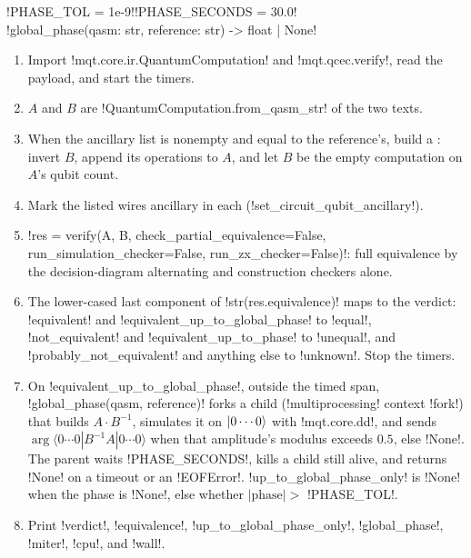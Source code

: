 \begin{signature}
\py!PHASE_TOL = 1e-9!\quad\py!PHASE_SECONDS = 30.0!\\
\py!global_phase(qasm: str, reference: str) -> float | None!
\end{signature}

\begin{algorithm}\label{alg:bench-tools-qcec}
\begin{enumerate}
\item Import \py!mqt.core.ir.QuantumComputation! and \py!mqt.qcec.verify!, read the payload, and start the timers.
\item $A$ and $B$ are \py!QuantumComputation.from_qasm_str! of the two texts.
\item When the ancillary list is nonempty and equal to the reference's, build a : invert $B$, append its operations to $A$, and let $B$ be the empty computation on $A$'s qubit count.
\item Mark the listed wires ancillary in each (\py!set_circuit_qubit_ancillary!).
\item \py!res = verify(A, B, check_partial_equivalence=False, run_simulation_checker=False, run_zx_checker=False)!: full equivalence by the decision-diagram alternating and construction checkers alone.
\item The lower-cased last component of \py!str(res.equivalence)! maps to the verdict: \code!equivalent! and \code!equivalent_up_to_global_phase! to \code!equal!, \code!not_equivalent! and \code!equivalent_up_to_phase! to \code!unequal!, and \code!probably_not_equivalent! and anything else to \code!unknown!. Stop the timers.
\item On \code!equivalent_up_to_global_phase!, outside the timed span, \py!global_phase(qasm, reference)! forks a child (\py!multiprocessing! context \code!fork!) that builds $A\cdot B^{-1}$, simulates it on $\lvert 0\cdots0 \rangle$ with \py!mqt.core.dd!, and sends $\arg\langle0\cdots0|B^{-1}A|0\cdots0\rangle$ when that amplitude's modulus exceeds $0.5$, else \py!None!. The parent waits \py!PHASE_SECONDS!, kills a child still alive, and returns \py!None! on a timeout or an \py!EOFError!. \code!up_to_global_phase_only! is \py!None! when the phase is \py!None!, else whether $|\text{phase}|>$ \py!PHASE_TOL!.
\item Print \code!verdict!, \code!equivalence!, \code!up_to_global_phase_only!, \code!global_phase!, \code!miter!, \code!cpu!, and \code!wall!.
\end{enumerate}
\end{algorithm}

